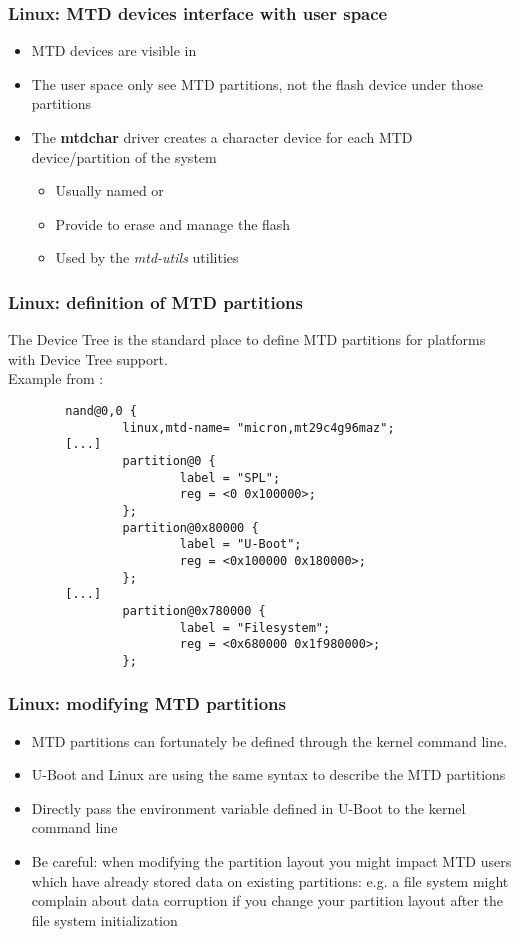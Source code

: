 \begin{frame}
  \frametitle{Linux: MTD devices interface with user space}
  \begin{itemize}
  \item MTD devices are visible in 
  \item The user space only see MTD partitions, not the flash device
    under those partitions
  \item The {\bf mtdchar} driver creates a character device for each
    MTD device/partition of the system
    \begin{itemize}
    \item Usually named  or 
    \item Provide  to erase and manage the flash
    \item Used by the {\em mtd-utils} utilities
    \end{itemize}
  \end{itemize}
\end{frame}


\begin{frame}[fragile]
  \frametitle{Linux: definition of MTD partitions}
  The Device Tree is the standard place to define MTD partitions
  for platforms with Device Tree support.\\
  Example from :
\begin{verbatim}
        nand@0,0 {
                linux,mtd-name= "micron,mt29c4g96maz";
		[...]
                partition@0 {
                        label = "SPL";
                        reg = <0 0x100000>;
                };
                partition@0x80000 {
                        label = "U-Boot";
                        reg = <0x100000 0x180000>;
                };
		[...]
                partition@0x780000 {
                        label = "Filesystem";
                        reg = <0x680000 0x1f980000>;
                };
\end{verbatim}
\end{frame}

\begin{frame}[fragile]
  \frametitle{Linux: modifying MTD partitions}
  \begin{itemize}
  \item MTD partitions can fortunately be defined through the kernel
    command line.
  \item U-Boot and Linux are using the same syntax to describe the MTD
    partitions
  \item Directly pass the  environment variable defined in
    U-Boot to the kernel command line
  \item Be careful: when modifying the partition layout you might impact
    MTD users which have already stored data on existing partitions: e.g.
    a file system might complain about data corruption if you change
    your partition layout after the file system initialization
\end{itemize}
\end{frame}

